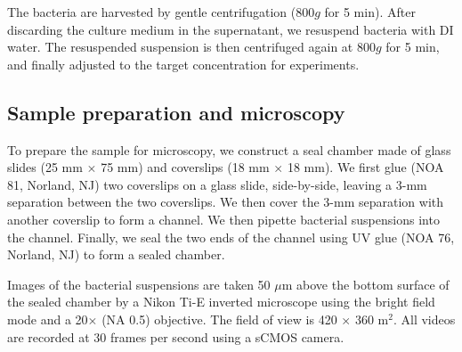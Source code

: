 \documentclass[twocolumn,aps,prx,amsmath,amssymb,longbibliography]{revtex4-2}
\begin{document}
The bacteria are harvested by gentle centrifugation ($800g$ for 5 min). After discarding the culture medium in the supernatant, we resuspend bacteria with DI water. The resuspended suspension is then centrifuged again at $800g$ for 5 min, and finally adjusted to the target concentration for experiments.

\subsection{Sample preparation and microscopy}

To prepare the sample for microscopy, we construct a seal chamber made of glass slides (25 mm $\times$ 75 mm) and coverslips (18 mm $\times$ 18 mm). We first glue (NOA 81, Norland, NJ) two coverslips on a glass slide, side-by-side, leaving a 3-mm separation between the two coverslips. We then cover the 3-mm separation with another coverslip to form a channel. We then pipette bacterial suspensions into the channel. Finally, we seal the two ends of the channel using UV glue (NOA 76, Norland, NJ) to form a sealed chamber.

Images of the bacterial suspensions are taken 50 $\mu$m above the bottom surface of the sealed chamber by a Nikon Ti-E inverted microscope using the bright field mode and a 20$\times$ (NA 0.5) objective. The field of view is 420 $\times$ 360 \textmu m$^2$. All videos are recorded at 30 frames per second using a sCMOS camera.


\end{document}
